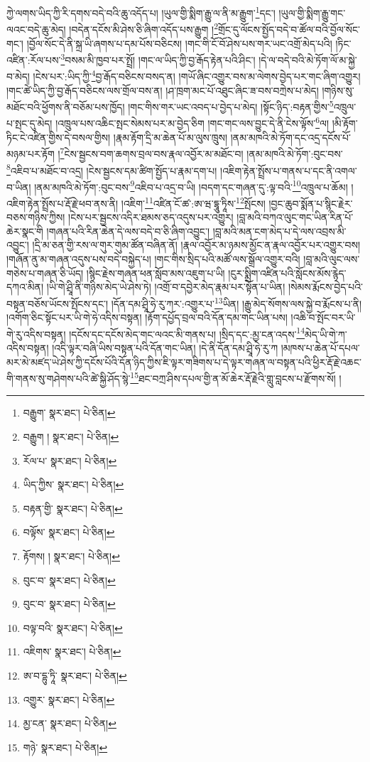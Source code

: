 ཀྱེ་ལགས་ཡིད་ཀྱི་རི་དགས་བདེ་བའི་ཆུ་འདོད་པ། །ཡུལ་གྱི་སྨིག་རྒྱུ་ལ་ནི་མ་རྒྱུག་\footnote{བརྒྱུག་  སྣར་ཐང་།  པེ་ཅིན། }དང་། །ཡུལ་གྱི་སྨིག་རྒྱུ་གང་ལའང་བདེ་ཆུ་མེད། །བདེན་དངོས་མི་ཤེས་ཅི་ཞིག་འདོད་པས་རྒྱུག །\footnote{བརྒྱུག །  སྣར་ཐང་།  པེ་ཅིན། }གྲོང་དུ་ལོངས་སྤྱོད་བདེ་བ་ཚོལ་བའི་བྱོལ་སོང་གང་། །བྱོལ་སོང་དེ་ནི་སྐྲ་ཡི་ཞགས་པ་དམ་པོས་བཅིངས། །གང་གི་ངོ་བོ་ཤེས་པས་གར་ཡང་འགྲོ་མེད་པའི། །ཏིང་འཛིན་:རོལ་པས་\footnote{རོལ་པ་  སྣར་ཐང་།  པེ་ཅིན། }བསམ་མི་ཁྱབ་པར་སྤྲོ། །གང་ལ་ཡིད་ཀྱི་བྱ་རྒོད་རྟེན་པའི་ཤིང་། །དེ་ལ་བདེ་བའི་མེ་ཏོག་ལོ་མ་སྐྱེ་བ་མེད། །ངེས་པར་:ཡིད་ཀྱི་\footnote{ཡིད་ཀྱིས་  སྣར་ཐང་།  པེ་ཅིན། }བྱ་རྒོད་བཅིངས་བསད་ན། །གཡོ་ཞིང་འགྱུར་བས་མ་ལེགས་བྱེད་པར་གང་ཞིག་འགྱུར། །གང་ཚེ་ཡིད་ཀྱི་བྱ་རྒོད་བཅིངས་ལས་གྲོལ་བས་ན། །ཤ་ཁྲག་མང་པོ་འཐུང་ཞིང་ཟ་བས་བཀྲེས་པ་མེད། །གཉིས་སུ་མཐོང་བའི་ཕྱོགས་ནི་བཅོམ་པས་ཁྱོད། །གང་གིས་གར་ཡང་འབད་པ་བྱེད་པ་མེད། །སྟོང་ཉིད་:བརྟན་གྱིས་\footnote{བརྟན་གྱི་  སྣར་ཐང་།  པེ་ཅིན། }འཁྲུལ་པ་སྤང་དུ་མེད། །འཁྲུལ་པས་འཆིང་སྤང་སེམས་པར་མ་བྱེད་ཅིག །གང་གང་ལས་བྱུང་དེ་ནི་ངེས་ལྟོས་\footnote{བལྟོས་  སྣར་ཐང་།  པེ་ཅིན། }ལ། །མི་རྟོག་ཏིང་ངེ་འཛིན་གྱིས་དེ་བསལ་གྱིས། །རྣམ་རྟོག་དྲི་མ་ཆེན་པོ་མ་ལུས་ཁྲུས། །ནམ་མཁའི་མེ་ཏོག་དང་འདྲ་དངོས་པོ་མཉམ་པར་རྟོག །\footnote{རྟོགས། །  སྣར་ཐང་།  པེ་ཅིན། }ངེས་སྦྱངས་བག་ཆགས་བྲལ་བས་རྣལ་འབྱོར་མ་མཐོང་བ། །ནམ་མཁའི་མེ་ཏོག་:བུང་བས་\footnote{བུང་བ་  སྣར་ཐང་།  པེ་ཅིན། }འཇིབ་པ་མཐོང་བ་འདྲ། །ངེས་སྦྱངས་དམ་ཚིག་སྤྱོད་པ་རྣམ་དག་པ། །འཇིག་རྟེན་སྤྲོས་པ་གནས་པ་དང་ནི་འགལ་བ་ཡིན། །ནམ་མཁའི་མེ་ཏོག་:བུང་བས་\footnote{བུང་བ་  སྣར་ཐང་།  པེ་ཅིན། }འཇིབ་པ་འདྲ་བ་ཡི། །བདག་དང་གཞན་དུ་:ལྟ་བའི་\footnote{བལྟ་བའི་  སྣར་ཐང་།  པེ་ཅིན། }འཁྲུལ་པ་ཆོམ། །འཇིག་རྟེན་སྤྲོས་པ་རྡོ་རྗེ་ཕབ་ནས་ནི། །འཇིག་\footnote{འཇིགས་  སྣར་ཐང་།  པེ་ཅིན། }འཛིན་ངོ་ཚ་:ཨ་ཝ་དྷཱུ་ཏཱིས་\footnote{ཨ་བ་དྷུ་ཏཱི་  སྣར་ཐང་།  པེ་ཅིན། }སྤོངས། །བྱང་ཆུབ་སྨོན་པ་སྙིང་རྗེར་བཅས་གཉིས་ཀྱིས། །ངེས་པར་སྦྱངས་འདིར་ཐམས་ཅད་འདུས་པར་འགྱུར། །བླ་མའི་བཀའ་ལུང་གང་ཡིན་རིན་པོ་ཆེར་སྣང་གི །གཞན་པའི་རིན་ཆེན་དེ་ལས་བདེ་བ་ཅི་ཞིག་འབྱུང་། །བླ་མའི་མན་ངག་མེད་པ་དེ་ལས་འབྲས་མི་འབྱུང་། །དྲི་མ་ཅན་གྱི་རས་ལ་གུར་གུམ་ཚོན་བཞིན་ནོ། །རྣལ་འབྱོར་མ་ཉམས་མྱོང་ན་རྣལ་འབྱོར་པར་འགྱུར་བས། །གཞོན་ནུ་མ་གཞན་འདུས་པས་བདེ་བསྐྱེད་པ། །གང་གིས་སྲིད་པའི་མཚོ་ལས་སྒྲོལ་འགྱུར་བའི། །བླ་མའི་ལུང་ལས་གཅེས་པ་གཞན་ཅི་ཡོད། །སྙིང་རྗེས་གཞན་ཕན་སློབ་མས་འཇུག་པ་ཡི། །ངུར་སྨྲིག་འཛིན་པའི་སློངས་མོས་རྙེད་དཀའ་མིན། །ཡི་གེ་ཤྲཱི་ནི་གཉིས་མེད་ཡེ་ཤེས་ཏེ། །འགྲོ་བ་དབྱེར་མེད་རྣམ་པར་སྟོན་པ་ཡིན། །སེམས་རྨོངས་བྱེད་པའི་བསྟན་བཅོས་ཡོངས་སྤོངས་དང་། །དོན་དམ་ཤྲཱི་ཧེ་རུ་ཀར་:འགྱུར་པ་\footnote{འགྱུར་  སྣར་ཐང་།  པེ་ཅིན། }ཡིན། །རྒྱུ་མེད་སོགས་ལས་སྐྱེ་བ་རྨོངས་པ་ནི། །འགོག་ཅིང་སྟོང་པར་ཡི་གེ་ཧེ་འདིས་བསྟན། །རྟོག་དཔྱོད་བྲལ་བའི་དོན་དམ་གང་ཡིན་པས། །འཆི་བ་སྤོང་བར་ཡི་གེ་རུ་འདིས་བསྟན། །དངོས་དང་དངོས་མེད་གང་ལའང་མི་གནས་པ། །སྲིད་དང་:མྱ་ངན་འདས་\footnote{མྱ་ངན་  སྣར་ཐང་།  པེ་ཅིན། }མེད་ཡི་གེ་ཀ་འདིས་བསྟན། །འདི་ལྟར་བཞི་ཡིས་བསྟན་པའི་དོན་གང་ཡིན། །དེ་ནི་དོན་དམ་ཤྲཱི་ཧེ་རུ་ཀ །མཁས་པ་ཆེན་པོ་དཔལ་མར་མེ་མཛད་ཡེ་ཤེས་ཀྱི་དངོས་པོའི་དོན་ཉིད་ཀྱིས་ཇི་ལྟར་གཟིགས་པ་དེ་ལྟར་གཞན་ལ་བསྟན་པའི་ཕྱིར་རྡོ་རྗེ་འཆང་གི་གནས་སུ་གཤེགས་པའི་ཚེ་སྐྱི་ཤོད་སྙེ་\footnote{གཉེ་  སྣར་ཐང་།  པེ་ཅིན། }ཐང་བཀྲ་ཤིས་དཔལ་གྱི་ན་མོ་ཆེར་རྡོ་རྗེའི་གླུ་བླངས་པ་རྫོགས་སོ། །
 